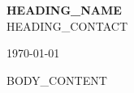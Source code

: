\documentclass[11pt]{article}
\begin{document}
\begin{center}
    \textbf{\Large HEADING_NAME} \\[2pt]
    \small HEADING_CONTACT
\end{center}

\vspace{8pt}

\today

\vspace{8pt}

BODY_CONTENT
\end{document}
